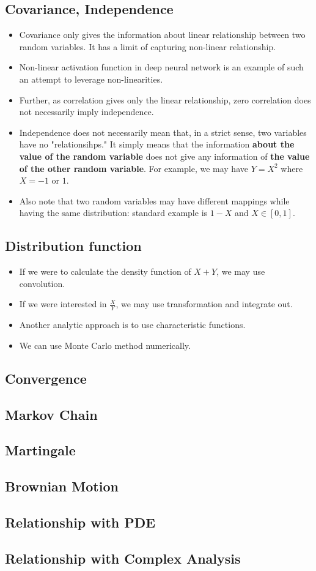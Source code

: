 \documentclass{article}
\theoremstyle{remark}
\begin{document}
\subsection*{Covariance, Independence}
\begin{itemize}
\item Covariance only gives the information about linear relationship between two random variables. It has a limit of capturing non-linear relationship.
\item Non-linear activation function in deep neural network is an example of such an attempt to leverage non-linearities.
\item Further, as correlation gives only the linear relationship, zero correlation does not necessarily imply independence.
\item Independence does not necessarily mean that, in a strict sense, two variables have no "relationsihps." It simply means
 that the information \textbf{about the value of the random variable} does not give any information of \textbf{the value of the other random variable}. For example, we may have $Y=X^2$ where $X=-1$ or $1$.
\item Also note that two random variables may have different mappings while having the same distribution: standard example is $1-X$ and $X\in [0,1]$.
\end{itemize}

\subsection*{Distribution function}
\begin{itemize}
\item If we were to calculate the density function of $X+Y$, we may use convolution.
\item If we were interested in $\frac XY$, we may use transformation and integrate out. 
\item Another analytic approach is to use characteristic functions.
\item We can use Monte Carlo method numerically.

\end{itemize}

\subsection*{Convergence}

\subsection*{Markov Chain}

\subsection*{Martingale}

\subsection*{Brownian Motion}

\subsection*{Relationship with PDE}

\subsection*{Relationship with Complex Analysis}
\end{document}
